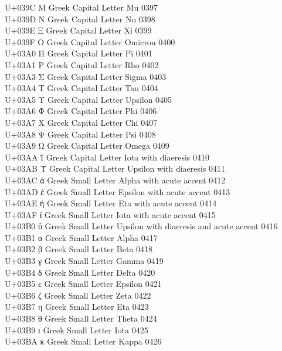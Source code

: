\documentclass[UTF8,nofonts]{ctexart}
\begin{document}
U+039C  Μ Greek Capital Letter Mu 0397\\
U+039D  Ν Greek Capital Letter Nu 0398\\
U+039E  Ξ Greek Capital Letter Xi 0399\\
U+039F  Ο Greek Capital Letter Omicron  0400\\
U+03A0  Π Greek Capital Letter Pi 0401\\
U+03A1  Ρ Greek Capital Letter Rho  0402\\
U+03A3  Σ Greek Capital Letter Sigma  0403\\
U+03A4  Τ Greek Capital Letter Tau  0404\\
U+03A5  Υ Greek Capital Letter Upsilon  0405\\
U+03A6  Φ Greek Capital Letter Phi  0406\\
U+03A7  Χ Greek Capital Letter Chi  0407\\
U+03A8  Ψ Greek Capital Letter Psi  0408\\
U+03A9  Ω Greek Capital Letter Omega  0409\\
U+03AA  Ϊ Greek Capital Letter Iota with diaeresis  0410\\
U+03AB  Ϋ Greek Capital Letter Upsilon with diaeresis 0411\\
U+03AC  ά Greek Small Letter Alpha with acute accent  0412\\
U+03AD  έ Greek Small Letter Epsilon with acute accent  0413\\
U+03AE  ή Greek Small Letter Eta with acute accent  0414\\
U+03AF  ί Greek Small Letter Iota with acute accent 0415\\
U+03B0  ΰ Greek Small Letter Upsilon with diaeresis and acute accent  0416\\
U+03B1  α Greek Small Letter Alpha  0417\\
U+03B2  β Greek Small Letter Beta 0418\\
U+03B3  γ Greek Small Letter Gamma  0419\\
U+03B4  δ Greek Small Letter Delta  0420\\
U+03B5  ε Greek Small Letter Epsilon  0421\\
U+03B6  ζ Greek Small Letter Zeta 0422\\
U+03B7  η Greek Small Letter Eta  0423\\
U+03B8  θ Greek Small Letter Theta  0424\\
U+03B9  ι Greek Small Letter Iota 0425\\
U+03BA  κ Greek Small Letter Kappa  0426\\
\end{document}
